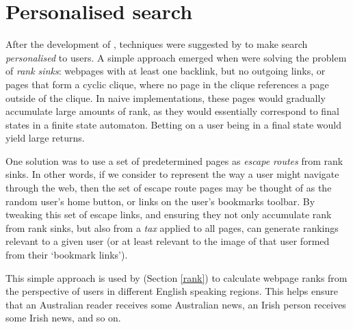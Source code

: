 \section{Personalised search}
After the development of \pr{} \cite{page1998}, techniques
were suggested by  to make search {\it personalised} to users.
A simple approach emerged when \citeauthor{page1999} were
solving the
problem of {\it rank sinks}: webpages with at least one backlink, but
no outgoing links, or pages that form a cyclic clique, where no page
in the clique references a page outside of the clique.  In naive
\pr{} implementations, these pages would gradually accumulate large
amounts of rank, as they would essentially correspond to final states
in a finite state automaton.  Betting on a user being in a
final state would yield large returns.

One solution was
to use a set of predetermined pages as {\it escape routes} from rank
sinks.  In other words, if we consider \pr{} to represent the way a
user might navigate through the web, then the set of escape route pages
may be thought of as the random user's home button, or links on the user's
bookmarks toolbar. By tweaking this set of escape links, and ensuring
they not only accumulate rank from rank sinks, but also from a {\it tax}
applied to all pages, \pr{} can generate rankings relevant to a
given user (or at least relevant to the image of that user formed from their
`bookmark links').

This simple approach is used by \nr{}
(Section \ref{rank}) to calculate webpage ranks from the perspective
of users in different English speaking regions.  This helps ensure that an
Australian reader receives some Australian news, an Irish person receives
some Irish news, and so on.

